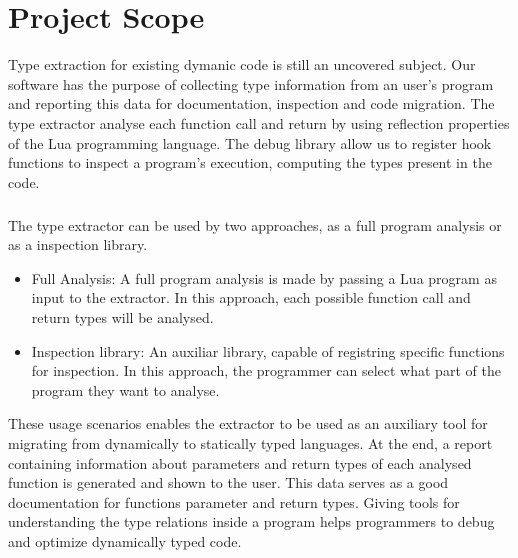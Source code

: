 
\chapter{Project Scope}
\label{cha:Project Scope}
Type extraction for existing dymanic code is still an uncovered subject. Our software has the purpose of collecting type information from an user's program and reporting this data for documentation, inspection and code migration. The type extractor analyse each function call and return by using reflection properties of the Lua programming language. The debug library allow us to register hook functions to inspect a program's execution, computing the types present in the code.
\paragraph*{}
The type extractor can be used by two approaches, as a full program analysis or as a inspection library.
\begin{itemize}
    \item{Full Analysis:} A full program analysis is made by passing a Lua program as input to the extractor. In this approach, each possible function call and return types will be analysed.
    \item{Inspection library:} An auxiliar library, capable of registring specific functions for inspection. In this approach, the programmer can select what part of the program they want to analyse.
\end{itemize}
 These usage scenarios enables the extractor to be used as an auxiliary tool for migrating from dynamically to statically typed languages. At the end, a report containing information about parameters and return types of each analysed function is generated and shown to the user. This data serves as a good documentation for functions parameter and return types. Giving tools for understanding the type relations inside a program helps programmers to debug and optimize dynamically typed code.



